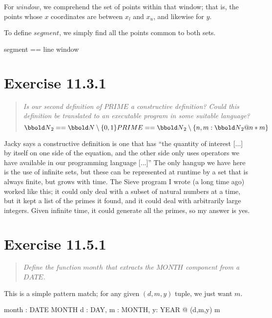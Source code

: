 \documentclass[10pt]{article}
\begin{document}
For $window$, we comprehend the set of points within that window; that is, the points whose $x$
coordinates are between $x_l$ and $x_u$, and likewise for $y$.

To define $segment$, we simply find all the points common to both sets.

\begin{syntax}
  segment == line \cap window
\end{syntax}



\section{Exercise 11.3.1}
\begin{quote}
  {\it Is our second definition of $PRIME$ a constructive definition?  Could this definition be
    translated to an executable program in some suitable language? 
  \[ \nat_2 == \nat \setminus \{ 0,1 \} \\
  PRIME == \nat_2 \setminus \{n,m : \nat_2 @ n*m\}\] }
\end{quote}

Jacky says a constructive definition is one that has ``the quantity of interest [...] by itself on
one side of the equation, and the other side only uses operators we have available in our
programming language [...]''  The only hangup we have here is the use of infinite sets, but these
can be represented at runtime by a set that is always finite, but grows with time.  The Sieve
program I wrote (a long time ago) worked like this; it could only deal with a subset of natural
numbers at a time, but it kept a list of the primes it found, and it could deal with arbitrarily
large integers.  Given infinite time, it could generate all the primes, so my answer is yes.



\section{Exercise 11.5.1}
\begin{quote}
  {\it Define the function $month$ that extracts the $MONTH$ component from a $DATE$.  }
\end{quote}

This is a simple pattern match; for any given $(d,m,y)$ tuple, we just want $m$.

\begin{axdef}
  month : DATE \fun MONTH 
  \where
  \forall d : DAY, m : MONTH, y: YEAR @ (d,m,y) \mapsto m
\end{axdef}
\end{document}
